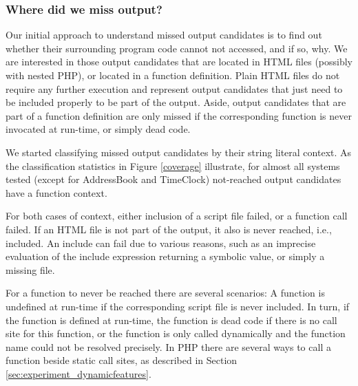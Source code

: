 \documentclass[sigconf]{acmart}
\begin{document}
\subsubsection{Where did we miss output?}\label{WhatLiteralsDidWeMiss?}
Our initial approach to understand missed output candidates is to find out
whether their surrounding program code cannot not accessed, and if
so, why. We are interested in those output candidates that are located in HTML
files (possibly with nested PHP), or located in a function definition. Plain
HTML files do not require any further execution and represent output candidates
that just need to be included properly to be part of the output. Aside, output
candidates that are part of a function definition are only missed if the
corresponding function is never invocated at run-time, or simply dead code.

We started classifying missed output candidates by their string literal
context. As the classification statistics in Figure \ref{coverage} illustrate,
for almost all systems tested (except for \textsf{AddressBook} and
\textsf{TimeClock}) not-reached output candidates have a function context. 


For both cases of context, either inclusion of a script file failed, or a
function call failed. If an HTML file is not part of the output, it also is
never reached, i.e., included. An include can fail due to various reasons, such
as an imprecise evaluation of the include expression returning a symbolic
value, or simply a missing file.

For a function to never be reached there are several scenarios: A function is
undefined at run-time if the corresponding script file is never included. In
turn, if the function is defined at run-time, the function is dead
code if there is no call site for this function, or the function is only called
dynamically and the function name could not be resolved precisely. In PHP there
are several ways to call a function beside static call sites, as described in
Section \ref{sec:experiment_dynamicfeatures}.
\end{document}
